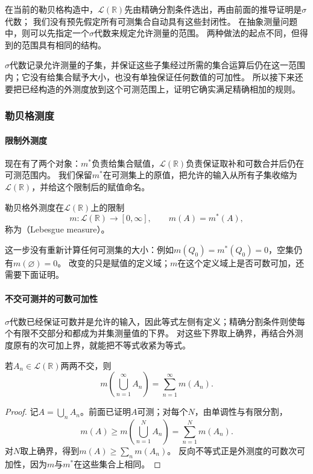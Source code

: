 在当前的勒贝格构造中，$\mathcal L(\mathbb R)$先由精确分割条件选出，再由前面的推导证明是$\sigma$代数；
我们没有预先假定所有可测集合自动具有这些封闭性。
在抽象测量问题中，则可以先指定一个$\sigma$代数来规定允许测量的范围。
两种做法的起点不同，但得到的范围具有相同的结构。

$\sigma$代数记录允许测量的子集，并保证这些子集经过所需的集合运算后仍在这一范围内；它没有给集合赋予大小，也没有单独保证任何数值的可加性。
所以接下来还要把已经构造的外测度放到这个可测范围上，证明它确实满足精确相加的规则。

\subsubsection{勒贝格测度}

\paragraph{限制外测度}

现在有了两个对象：$m^*$负责给集合赋值，$\mathcal L(\mathbb R)$负责保证取补和可数合并后仍在可测范围内。
我们保留$m^*$在可测集上的原值，把允许的输入从所有子集收缩为$\mathcal L(\mathbb R)$，并给这个限制后的赋值命名。
\begin{definition}[勒贝格测度]
\label{def:analysis-lebesgue-measure}
勒贝格外测度在$\mathcal L(\mathbb R)$上的限制
\[
 m:\mathcal L(\mathbb R)\to[0,\infty],\qquad m(A)=m^*(A),
\]
称为（Lebesgue measure）。
\end{definition}

这一步没有重新计算任何可测集的大小：例如$m(Q_0)=m^*(Q_0)=0$，空集仍有$m(\varnothing)=0$。
改变的只是赋值的定义域；$m$在这个定义域上是否可数可加，还需要下面证明。

\paragraph{不交可测并的可数可加性}

$\sigma$代数已经保证可数并是允许的输入，因此等式左侧有定义；精确分割条件则使每个有限不交部分和都成为并集测量值的下界。
对这些下界取上确界，再结合外测度原有的次可加上界，就能把不等式收紧为等式。
\begin{theorem}[勒贝格测度的可数可加性]
\label{thm:analysis-lebesgue-countable-additivity}
若$A_n\in\mathcal L(\mathbb R)$两两不交，则
\[
 m\left(\bigcup_{n=1}^{\infty}A_n\right)=\sum_{n=1}^{\infty}m(A_n).
\]
\end{theorem}
\begin{proof}
记$A=\bigcup_n A_n$。前面已证明$A$可测；对每个$N$，由单调性与有限分割，
\[
 m(A)\geq m\left(\bigcup_{n=1}^NA_n\right)=\sum_{n=1}^Nm(A_n).
\]
对$N$取上确界，得到$m(A)\geq\sum_n m(A_n)$。
反向不等式正是外测度的可数次可加性，因为$m$与$m^*$在这些集合上相同。
\end{proof}

